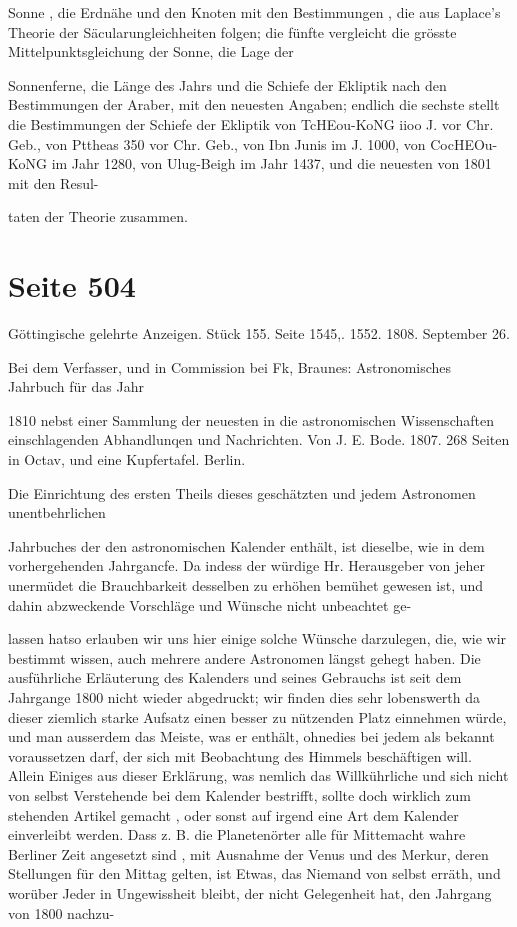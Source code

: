 \documentclass[10pt,a4paper]{article}
\begin{document}
Sonne , die Erdnähe und den Knoten mit den Bestimmungen , die aus Laplace's Theorie der Säcularungleichheiten folgen; die fünfte vergleicht die grösste Mittelpunktsgleichung der Sonne, die Lage der

Sonnenferne, die Länge des Jahrs und die Schiefe der Ekliptik nach den Bestimmungen der Araber, mit den neuesten Angaben; endlich die sechste stellt die Bestimmungen der Schiefe der Ekliptik von TcHEou-KoNG iioo J. vor Chr. Geb., von Pttheas 350 vor Chr. Geb., von Ibn Junis im J. 1000, von CocHEOu-KoNG im Jahr 1280, von Ulug-Beigh im Jahr 1437, und die neuesten von 1801 mit den Resul-

taten der Theorie zusammen.


\newpage
\section*{Seite 504}
Göttingische gelehrte Anzeigen. Stück 155. Seite 1545,. 1552. 1808. September 26.

Bei dem Verfasser, und in Commission bei Fk, Braunes: Astronomisches Jahrbuch für das Jahr

1810 nebst einer Sammlung der neuesten in die astronomischen Wissenschaften einschlagenden Abhandlunqen und Nachrichten. Von J. E. Bode. 1807. 268 Seiten in Octav, und eine Kupfertafel. Berlin.

Die Einrichtung des ersten Theils dieses geschätzten und jedem Astronomen unentbehrlichen

Jahrbuches der den astronomischen Kalender enthält, ist dieselbe, wie in dem vorhergehenden Jahrgancfe. Da indess der würdige Hr. Herausgeber von jeher unermüdet die Brauchbarkeit desselben zu erhöhen bemühet gewesen ist, und dahin abzweckende Vorschläge und Wünsche nicht unbeachtet ge-

lassen hatso erlauben wir uns hier einige solche Wünsche darzulegen, die, wie wir bestimmt wissen, auch mehrere andere Astronomen längst gehegt haben. Die ausführliche Erläuterung des Kalenders und seines Gebrauchs ist seit dem Jahrgange 1800 nicht wieder abgedruckt; wir finden dies sehr lobenswerth da dieser ziemlich starke Aufsatz einen besser zu nützenden Platz einnehmen würde, und man ausserdem das Meiste, was er enthält, ohnedies bei jedem als bekannt voraussetzen darf, der sich mit Beobachtung des Himmels beschäftigen will. Allein Einiges aus dieser Erklärung, was nemlich das Willkührliche und sich nicht von selbst Verstehende bei dem Kalender bestrifft, sollte doch wirklich zum stehenden Artikel gemacht , oder sonst auf irgend eine Art dem Kalender einverleibt werden. Dass z. B. die Planetenörter alle für Mittemacht wahre Berliner Zeit angesetzt sind , mit Ausnahme der Venus und des Merkur, deren Stellungen für den Mittag gelten, ist Etwas, das Niemand von selbst erräth, und worüber Jeder in Ungewissheit bleibt, der nicht Gelegenheit hat, den Jahrgang von 1800 nachzu-
\end{document}
